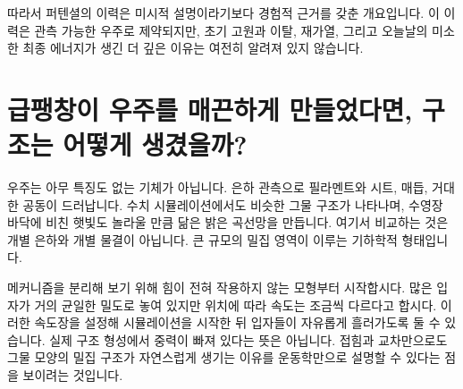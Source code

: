 \begin{classroomqa}
\end{classroomqa}

\begin{classroomqa}
\end{classroomqa}

따라서 퍼텐셜의 이력은 미시적 설명이라기보다 경험적 근거를 갖춘 개요입니다. 이 이력은 관측 가능한 우주로 제약되지만, 초기 고원과 이탈, 재가열, 그리고 오늘날의 미소한 최종 에너지가 생긴 더 깊은 이유는 여전히 알려져 있지 않습니다.

\section{급팽창이 우주를 매끈하게 만들었다면, 구조는 어떻게 생겼을까?}

우주는 아무 특징도 없는 기체가 아닙니다. 은하 관측으로 필라멘트와 시트, 매듭, 거대한 공동이 드러납니다. 수치 시뮬레이션에서도 비슷한 그물 구조가 나타나며, 수영장 바닥에 비친 햇빛도 놀라울 만큼 닮은 밝은 곡선망을 만듭니다. 여기서 비교하는 것은 개별 은하와 개별 물결이 아닙니다. 큰 규모의 밀집 영역이 이루는 기하학적 형태입니다.

메커니즘을 분리해 보기 위해 힘이 전혀 작용하지 않는 모형부터 시작합시다. 많은 입자가 거의 균일한 밀도로 놓여 있지만 위치에 따라 속도는 조금씩 다르다고 합시다. 이러한 속도장을 설정해 시뮬레이션을 시작한 뒤 입자들이 자유롭게 흘러가도록 둘 수 있습니다. 실제 구조 형성에서 중력이 빠져 있다는 뜻은 아닙니다. 접힘과 교차만으로도 그물 모양의 밀집 구조가 자연스럽게 생기는 이유를 운동학만으로 설명할 수 있다는 점을 보이려는 것입니다.

\begin{classroomqa}
\end{classroomqa}

